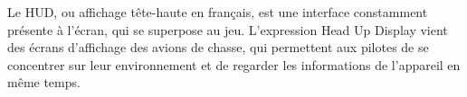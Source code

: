 \documentclass[../doc.tex]{subfiles}
\begin{document}
Le HUD, ou affichage tête-haute en français, est une interface constamment
présente à l'écran, qui se superpose au jeu. L'expression Head Up Display vient
des écrans d'affichage des avions de chasse, qui permettent aux pilotes de se 
concentrer sur leur environnement et de regarder les informations de l'appareil
en même temps.
\end{document}
